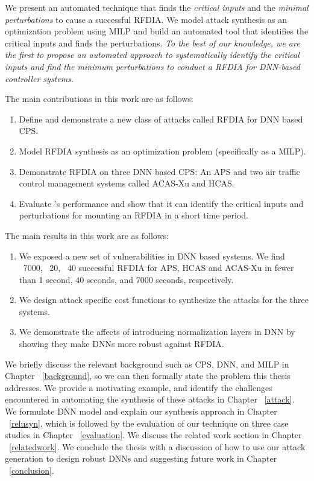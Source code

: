 We present an automated technique that finds the \textit{critical inputs} and the \textit{minimal perturbations} to cause a successful \ac{RFDIA}. 
We model attack synthesis as an optimization problem using \ac{MILP} and build an automated tool \tool that identifies the critical inputs and finds the perturbations.
{\em To the best of our knowledge, we are the first to  propose an automated approach to systematically identify the critical inputs and find the minimum perturbations to conduct a \ac{RFDIA} for DNN-based controller systems.}

The main contributions in this work are as follows:

\begin{enumerate}
	\item Define and demonstrate a new class of attacks called \ac{RFDIA} for \ac{DNN} based \ac{CPS}. 
	\item Model \ac{RFDIA} synthesis as an optimization problem (specifically as a \ac{MILP}). 
	\item Demonstrate \ac{RFDIA} on three \ac{DNN} based \ac{CPS}:  An \ac{APS} and two air traffic control management systems called \ac{ACAS-Xu} and \ac{HCAS}.
	\item Evaluate \tool's performance and show that it can identify the critical inputs and perturbations for mounting an \ac{RFDIA} in a short time period.  
\end{enumerate}

The main results in this work are as follows:

\begin{enumerate}
	\item We exposed a new set of vulnerabilities in \ac{DNN} based systems. 
	 We find ~7000, ~20, ~40 successful \ac{RFDIA} for \ac{APS}, \ac{HCAS} and \ac{ACAS-Xu} in fewer than 1 second, 40 seconds, and 7000 seconds, respectively. 
	\item We design attack specific cost functions to synthesize the attacks for the three systems.
	\item We demonstrate the affects of introducing normalization layers in \ac{DNN} by showing they make \ac{DNN}s more robust against \ac{RFDIA}. 
\end{enumerate}

	
We briefly discuss the relevant background such as \ac{CPS}, \ac{DNN}, and \ac{MILP} in Chapter ~\ref{background}, so we can then formally state the problem this thesis addresses. 
We provide a motivating example, and identify the challenges encountered in automating the synthesis of these attacks in Chapter ~\ref{attack}.
We formulate \ac{DNN} model and explain our synthesis approach in Chapter ~\ref{relusyn}, which is followed by the evaluation of our technique on three case studies in Chapter ~\ref{evaluation}.
We discuss the related work section in Chapter ~\ref{relatedwork}.
We conclude the thesis with a discussion of how to use our attack generation to design robust \ac{DNN}s and suggesting future work in Chapter ~\ref{conclusion}.











